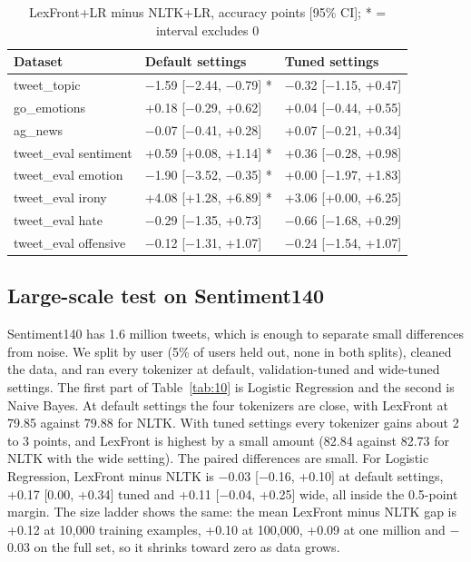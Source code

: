 \documentclass{ieeeaccess}
\begin{document}
\begin{table}[!tb]
\caption{LexFront+LR minus NLTK+LR, accuracy points [95\% CI]; * = interval excludes 0}\label{tab:9}
\centering
\footnotesize
\setlength{\tabcolsep}{3pt}
\begin{tabular}{lll}
\toprule
\textbf{Dataset} & \textbf{Default settings} & \textbf{Tuned settings} \\
\midrule
tweet\_topic & $-$1.59 [$-$2.44, $-$0.79] * & $-$0.32 [$-$1.15, +0.47] \\
go\_emotions & +0.18 [$-$0.29, +0.62] & +0.04 [$-$0.44, +0.55] \\
ag\_news & $-$0.07 [$-$0.41, +0.28] & +0.07 [$-$0.21, +0.34] \\
tweet\_eval sentiment & +0.59 [+0.08, +1.14] * & +0.36 [$-$0.28, +0.98] \\
tweet\_eval emotion & $-$1.90 [$-$3.52, $-$0.35] * & +0.00 [$-$1.97, +1.83] \\
tweet\_eval irony & +4.08 [+1.28, +6.89] * & +3.06 [+0.00, +6.25] \\
tweet\_eval hate & $-$0.29 [$-$1.35, +0.73] & $-$0.66 [$-$1.68, +0.29] \\
tweet\_eval offensive & $-$0.12 [$-$1.31, +1.07] & $-$0.24 [$-$1.54, +1.07] \\
\bottomrule
\end{tabular}
\end{table}

\subsection{Large-scale test on Sentiment140}\label{sec:4.7}
Sentiment140 has 1.6 million tweets, which is enough to separate small differences from noise. We split by user (5\% of users held out, none in both splits), cleaned the data, and ran every tokenizer at default, validation-tuned and wide-tuned settings. The first part of Table~\ref{tab:10} is Logistic Regression and the second is Naive Bayes. At default settings the four tokenizers are close, with LexFront at 79.85 against 79.88 for NLTK. With tuned settings every tokenizer gains about 2 to 3 points, and LexFront is highest by a small amount (82.84 against 82.73 for NLTK with the wide setting). The paired differences are small. For Logistic Regression, LexFront minus NLTK is $-$0.03 [$-$0.16, +0.10] at default settings, +0.17 [0.00, +0.34] tuned and +0.11 [$-$0.04, +0.25] wide, all inside the 0.5-point margin. The size ladder shows the same: the mean LexFront minus NLTK gap is +0.12 at 10,000 training examples, +0.10 at 100,000, +0.09 at one million and $-$0.03 on the full set, so it shrinks toward zero as data grows.
\end{document}
